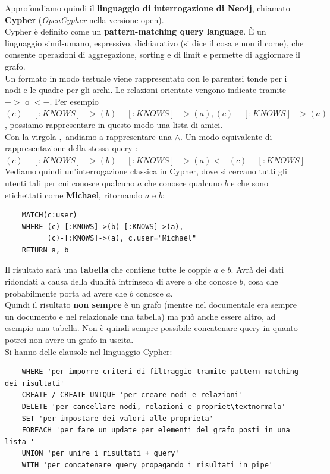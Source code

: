 Approfondiamo quindi il \textbf{linguaggio di interrogazione di Neo4j}, chiamato \textbf{Cypher} (\textit{OpenCypher} nella versione open).\\ 
Cypher è definito come un \textbf{pattern-matching query language}. È un linguaggio simil-umano, espressivo, dichiarativo (si dice il cosa e non il come), che consente operazioni di aggregazione, sorting e di limit e permette di aggiornare il grafo.\\ Un formato in modo testuale viene rappresentato con le parentesi tonde per i nodi e le quadre per gli archi. Le relazioni orientate vengono indicate tramite $->$ o $<-$.
Per esempio \\ $(c)-[:KNOWS]->(b)-[:KNOWS]->(a), (c)-[:KNOWS]->(a)$, possiamo rappresentare in questo modo una lista di amici. \\ Con la virgola $,$ andiamo a rappresentare una $\land$. Un modo equivalente di rappresentazione della stessa query :\\
$(c)-[:KNOWS]->(b)-[:KNOWS]->(a)<-(c)-[:KNOWS]$
Vediamo quindi un'interrogazione classica in Cypher, dove si cercano tutti gli utenti tali per cui conosce qualcuno $a$ che conosce qualcuno $b$ e che sono etichettati come \textbf{Michael}, ritornando $a$ e $b$: 
\begin{lstlisting}
    MATCH(c:user)
    WHERE (c)-[:KNOWS]->(b)-[:KNOWS]->(a),
          (c)-[:KNOWS]->(a), c.user="Michael"
    RETURN a, b
\end{lstlisting}
Il risultato sarà una \textbf{tabella} che contiene tutte le coppie $a$ e $b$. Avrà dei dati ridondati a causa della dualità intrinseca di avere $a$ che conosce $b$, cosa che probabilmente porta ad avere che $b$ conosce $a$. \\
Quindi il risultato \textbf{non sempre} è un grafo (mentre nel documentale era sempre un documento e nel relazionale una tabella) ma può anche essere altro, ad esempio una tabella. Non è quindi sempre possibile concatenare query in quanto potrei non avere un grafo in uscita.\\
Si hanno delle clausole nel linguaggio Cypher:
\begin{lstlisting}
    WHERE 'per imporre criteri di filtraggio tramite pattern-matching dei risultati'
    CREATE / CREATE UNIQUE 'per creare nodi e relazioni'
    DELETE 'per cancellare nodi, relazioni e propriet\textnormala'
    SET 'per impostare dei valori alle proprieta'
    FOREACH 'per fare un update per elementi del grafo posti in una lista '
    UNION 'per unire i risultati + query'
    WITH 'per concatenare query propagando i risultati in pipe'
\end{lstlisting}


